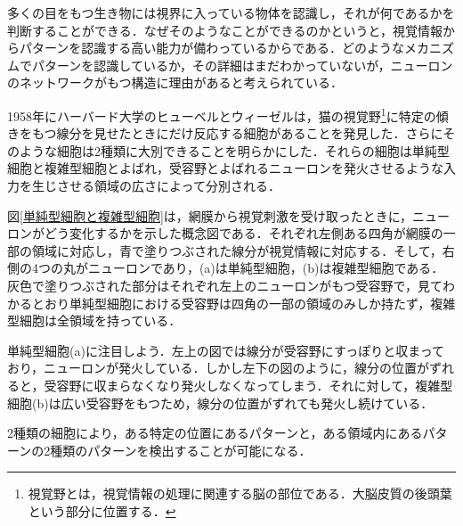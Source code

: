 \documentclass[a4paper,11pt]{jsreport}
\begin{document}
多くの目をもつ生き物には視界に入っている物体を認識し，それが何であるかを判断することができる．なぜそのようなことができるのかというと，視覚情報からパターンを認識する高い能力が備わっているからである．どのようなメカニズムでパターンを認識しているか，その詳細はまだわかっていないが，ニューロンのネットワークがもつ構造に理由があると考えられている．\par
1958年にハーバード大学のヒューベルとウィーゼルは，猫の視覚野\footnote{視覚野とは，視覚情報の処理に関連する脳の部位である．大脳皮質の後頭葉という部分に位置する．}に特定の傾きをもつ線分を見せたときにだけ反応する細胞があることを発見した\cite{hubel1962}．さらにそのような細胞は2種類に大別できることを明らかにした．それらの細胞は単純型細胞と複雑型細胞とよばれ，受容野とよばれるニューロンを発火させるような入力を生じさせる領域の広さによって分別される．\par
図\ref{単純型細胞と複雑型細胞}は，網膜から視覚刺激を受け取ったときに，ニューロンがどう変化するかを示した概念図である．それぞれ左側ある四角が網膜の一部の領域に対応し，青で塗りつぶされた線分が視覚情報に対応する．そして，右側の4つの丸がニューロンであり，(a)は単純型細胞，(b)は複雑型細胞である．灰色で塗りつぶされた部分はそれぞれ左上のニューロンがもつ受容野で，見てわかるとおり単純型細胞における受容野は四角の一部の領域のみしか持たず，複雑型細胞は全領域を持っている．\par
単純型細胞(a)に注目しよう．左上の図では線分が受容野にすっぽりと収まっており，ニューロンが発火している．しかし左下の図のように，線分の位置がずれると，受容野に収まらなくなり発火しなくなってしまう．それに対して，複雑型細胞(b)は広い受容野をもつため，線分の位置がずれても発火し続けている．\par
2種類の細胞により，ある特定の位置にあるパターンと，ある領域内にあるパターンの2種類のパターンを検出することが可能になる．
\end{document}
